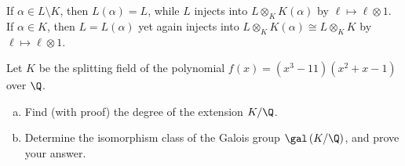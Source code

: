 \documentclass[10pt]{mypackage}
\begin{document}
\begin{solution}
\begin{enumerate}[(a)]
      If $\alpha\in L\setminus K$, then $L\left( \alpha \right) = L$, while $L$ injects into $L\otimes_{K}K\left( \alpha \right)$ by $\ell\mapsto \ell\otimes 1$. If $\alpha\in K$, then $L = L(\alpha)$ yet again injects into $L\otimes_{K}K(\alpha) \cong L\otimes_{K}K$ by $\ell \mapsto \ell\otimes 1$.
  \end{enumerate}
\end{solution}
\begin{problem}[Problem 8]
  Let $K$ be the splitting field of the polynomial $f(x) = \left( x^3-11 \right)\left( x^2 + x - 1 \right)$ over $\Q$.
  \begin{enumerate}[(a)]
    \item Find (with proof) the degree of the extension $K/\Q$.
    \item Determine the isomorphism class of the Galois group $\gal\left( K/\Q \right)$, and prove your answer. 
  \end{enumerate}
\end{problem}
\end{document}
